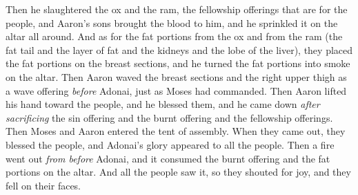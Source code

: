 \begin{biblechapter}
\verse Then he slaughtered the ox and the ram, the fellowship offerings that are for the people, and Aaron’s sons brought the blood to him, and he sprinkled it on the altar all around.
\verse And as for the fat portions from the ox and from the ram (the fat tail and the layer of fat and the kidneys and the lobe of the liver),
\verse they placed the fat portions on the breast sections, and he turned the fat portions into smoke on the altar.
\verse Then Aaron waved the breast sections and the right upper thigh as a wave offering \textit{before} Adonai, just as Moses had commanded.
\verse Then Aaron lifted his hand toward the people, and he blessed them, and he came down \textit{after} \textit{sacrificing} the sin offering and the burnt offering and the fellowship offerings.
\verse Then Moses and Aaron entered the tent of assembly. When they came out, they blessed the people, and Adonai’s glory appeared to all the people.
\verse Then a fire went out \textit{from before} Adonai, and it consumed the burnt offering and the fat portions on the altar. And all the people saw it, so they shouted for joy, and they fell on their faces.
\end{biblechapter}


